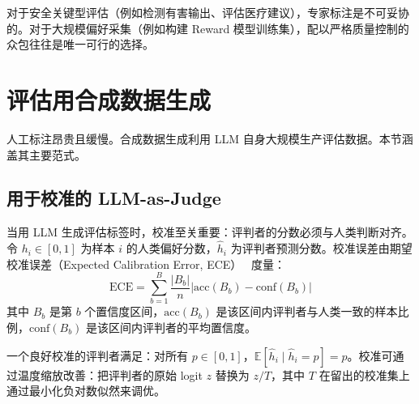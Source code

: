 对于安全关键型评估（例如检测有害输出、评估医疗建议），专家标注是不可妥协的。对于大规模偏好采集（例如构建 Reward 模型训练集），配以严格质量控制的众包往往是唯一可行的选择。

\section{评估用合成数据生成}
\label{subsec:synthetic-data}

人工标注昂贵且缓慢。合成数据生成利用 LLM 自身大规模生产评估数据。本节涵盖其主要范式。

\subsection{用于校准的 LLM-as-Judge}
\label{llm-as-judge-for-calibration}

当用 LLM 生成评估标签时，校准至关重要：评判者的分数必须与人类判断对齐。令 $h_i \in [0,1]$ 为样本 $i$ 的人类偏好分数，$\hat{h}_i$ 为评判者预测分数。校准误差由期望校准误差（Expected Calibration Error, ECE）~\cite{guo2017calibration} 度量：
\begin{equation}
    \text{ECE} = \sum_{b=1}^{B} \frac{|B_b|}{n} \left| \text{acc}(B_b) - \text{conf}(B_b) \right|
\end{equation}
其中 $B_b$ 是第 $b$ 个置信度区间，$\text{acc}(B_b)$ 是该区间内评判者与人类一致的样本比例，$\text{conf}(B_b)$ 是该区间内评判者的平均置信度。

一个良好校准的评判者满足：对所有 $p \in [0,1]$，$\mathbb{E}[\hat{h}_i \mid \hat{h}_i = p] = p$。校准可通过温度缩放改善：把评判者的原始 logit $z$ 替换为 $z/T$，其中 $T$ 在留出的校准集上通过最小化负对数似然来调优。

